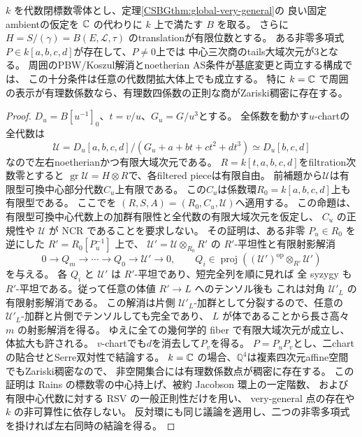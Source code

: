 \begin{theorem}[有限位数境界を持つ固定ambientの開な正則範囲]
\label{CSBGthm:global-open}
$k$ を代数閉標数零体とし、定理\ref{CSBGthm:global-very-general}の
良い固定ambientの仮定を $\mathbb C$ の代わりに $k$ 上で満たす $B$ を取る。
さらに $H=S/(\gamma)=B(E,\mathcal L,\tau)$ のtranslationが有限位数とする。
ある非零多項式$P\in k[a,b,c,d]$が存在して、$P\ne0$上では
中心三次商のtails大域次元が3となる。
周囲のPBW/Koszul解消とnoetherian AS条件が基底変更と両立する構成では、
この十分条件は任意の代数閉拡大体上でも成立する。
特に $k=\mathbb C$ で周囲の表示が有理数係数なら、有理数四係数の正則な商がZariski稠密に存在する。
\end{theorem}
\begin{proof}
$D_u=B[u^{-1}]_0$、$t=v/u$、$G_u=G/u^3$とする。
全係数を動かす$u$-chartの全代数は
\[
 \mathcal U=D_u[a,b,c,d]/(G_u+a+bt+ct^2+dt^3)
 \simeq D_u[b,c,d]
\]
なので左右noetherianかつ有限大域次元である。
$R=k[t,a,b,c,d]$をfiltration次数零とすると
$\operatorname{gr}\mathcal U=H\otimes R$で、各filtered pieceは有限自由。
前補題から$\mathcal U$は有限型可換中心部分代数$C_u$上有限である。
この$C_u$は係数環$R_0=k[a,b,c,d]$上も有限型である。
ここで\cite[Proposition~2.1, proof steps (6)--(8)]{RSVdB}を
$(R,S,A)=(R_0,C_u,\mathcal U)$へ適用する。
この命題は、有限型可換中心代数上の加群有限性と全代数の有限大域次元を仮定し、
$C_u$ の正規性や $\mathcal U$ が NCR であることを要求しない。
その証明は、ある非零 $P_u\in R_0$ を逆にした $R'=R_0[P_u^{-1}]$ 上で、
$\mathcal U'=\mathcal U\otimes_{R_0}R'$ の $R'$-平坦性と有限射影解消
\[
 0\longrightarrow Q_m\longrightarrow\cdots\longrightarrow Q_0
 \longrightarrow\mathcal U'\longrightarrow0,
 \qquad Q_i\in\operatorname{proj}
       ((\mathcal U')^{\mathrm{op}}\otimes_{R'}\mathcal U')
\]
を与える。
各 $Q_i$ と $\mathcal U'$ は $R'$-平坦であり、短完全列を順に見れば
全 syzygy も $R'$-平坦である。従って任意の体値 $R'\to L$ へのテンソル後も
これは対角 $\mathcal U'_L$ の有限射影解消である。
この解消は片側 $\mathcal U'_L$-加群として分裂するので、任意の
$\mathcal U'_L$-加群と片側でテンソルしても完全であり、
$L$ が体であることから長さ高々 $m$ の射影解消を得る。
ゆえに全ての幾何学的 fiber で有限大域次元が成立し、体拡大も許される。
$v$-chartでも$d$を消去して$P_v$を得る。
$P=P_uP_v$とし、二chartの貼合せとSerre双対性で結論する。
$k=\mathbb C$ の場合、$\mathbb Q^4$は複素四次元affine空間でもZariski稠密なので、
非空開集合には有理数係数点が稠密に存在する。
この証明は Rains の標数零の中心持上げ、被約 Jacobson 環上の一定階数、
および有限中心代数に対する RSV の一般正則性だけを用い、
very-general 点の存在や $k$ の非可算性に依存しない。
反対環にも同じ議論を適用し、二つの非零多項式を掛ければ左右同時の結論を得る。
\end{proof}

